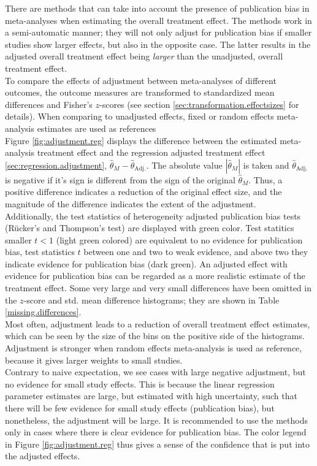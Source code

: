\documentclass[11pt,a4paper,twoside]{book}\usepackage[]{graphicx}\usepackage[]{color}
\begin{document}
There are methods that can take into account the presence of publication bias in meta-analyses when estimating the overall treatment effect. The methods work in a semi-automatic manner; they will not only adjust for publication bias if smaller studies show larger effects, but also in the opposite case. The latter results in the adjusted overall treatment effect being \textit{larger} than the unadjusted, overall treatment effect. \\
To compare the effects of adjustment between meta-analyses of different outcomes, the outcome measures are transformed to standardized mean differences and Fisher's $z$-scores (see section \ref{sec:transformation.effectsizes} for details). When comparing to unadjusted effects, fixed or random effects meta-analysis estimates are used as references\\
Figure \ref{fig:adjustment.reg} displays the difference between the estimated meta-analysis treatment effect and the regression adjusted treatment effect \ref{sec:regression.adjustment}, $\hat{\theta}_M - \hat{\theta}_\textrm{Adj.}$. The absolute value $|\hat{\theta}_M|$ is taken and $\hat{\theta}_\textrm{Adj.}$ is negative if it's sign is different from the sign of the original $\hat{\theta}_M$. Thus, a positive difference indicates a reduction of the original effect size, and the magnitude of the difference indicates the extent of the adjustment. \\
Additionally, the test statistics of heterogeneity adjusted publication bias tests (R\"ucker's and Thompson's test) are displayed with green color. Test statitics smaller $t < 1$ (light green colored) are equivalent to no evidence for publication bias, test statistics $t$ between one and two to weak evidence, and above two they indicate evidence for publication bias (dark green). An adjusted effect with evidence for publication bias can be regarded as a more realistic estimate of the treatment effect. Some very large and very small differences have been omitted in the $z$-score and std. mean difference histograms; they are shown in Table \ref{missing.differences}. \\
Most often, adjustment leads to a reduction of overall treatment effect estimates, which can be seen by the size of the bins on the positive side of the histograms. Adjustment is stronger when random effects meta-analysis is used as reference, because it gives larger weights to small studies.\\
Contrary to naive expectation, we see cases with large negative adjustment, but no evidence for small study effects. This is because the linear regression parameter estimates are large, but estimated with high uncertainty, such that there will be few evidence for small study effects (publication bias), but nonetheless, the adjustment will be large. It is recommended to use the methods only in cases where there is clear evidence for publication bias. The color legend in Figure \ref{fig:adjustment.reg} thus gives a sense of the confidence that is put into the adjusted effects. \\
\end{document}
